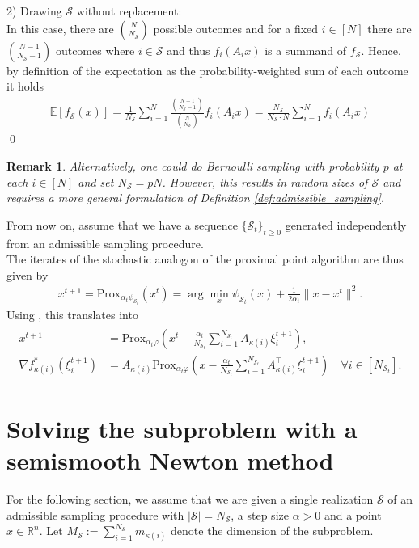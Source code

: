 \documentclass[12pt,a4paper,twoside]{article}
\makeatletter
\renewcommand*{\eqref}[1]{%
	\hyperref[{#1}]{\textup{\tagform@{\ref*{#1}}}}%
}
\theoremstyle{plain}
\newtheorem{rem}[thm]{Remark}
\theoremstyle{note}
\numberwithin{thm}{section}
\newcommand{\prox}[2]{\text{Prox}_{#1}\left(#2\right)}
\newcommand{\oneover}[1]{\frac{1}{#1}}
\newcommand{\ixmap}[1]{{\kappa(#1)}}
\let\temp\phi
\let\phi\varphi
\let\varphi\temp
\makeatother
\begin{document}
	2) Drawing $\mathcal{S}$ without replacement:\\
	In this case, there are ${N \choose N_\mathcal{S}}$ possible outcomes and for a fixed $i\in [N]$ there are ${N-1 \choose N_\mathcal{S}-1}$ outcomes where $i\in \mathcal{S}$ and thus $f_i(A_ix)$ is a summand of $f_\mathcal{S}$. Hence, by definition of the expectation as the probability-weighted sum of each outcome it holds
	\begin{align*}
	\mathbb{E}[f_\mathcal{S}(x)] =   \oneover{N_\mathcal{S}} \sum_{i=1}^{N} \frac{{N-1 \choose N_\mathcal{S}-1}}{{N \choose N_\mathcal{S}}} f_i(A_ix) = \frac{N_\mathcal{S}}{N_\mathcal{S} \cdot N} \sum_{i=1}^{N} f_i(A_ix)  
	\end{align*}
	\qed
	\\
	\begin{rem}
		Alternatively, one could do Bernoulli sampling with probability $p$ at each $i\in [N]$ and set $N_\mathcal{S} = pN$. However, this results in random sizes of $\mathcal{S}$ and requires a more general formulation of Definition \ref{def:admissible_sampling}.
	\end{rem}	
	From now on, assume that we have a sequence $\{\mathcal{S}_t\}_{t\geq 0}$ generated independently from an admissible sampling procedure.\\
	The iterates of the stochastic analogon of the proximal point algorithm are thus given by
	\begin{align*}
		x^{t+1} = \prox{\alpha_t \psi_{\mathcal{S}_t}}{x^t} = \arg \min_x \psi_{\mathcal{S}_t}(x) + \oneover{2\alpha_t}\|x-x^t\|^2.
	\end{align*}
	Using \eqref{eqn:nonlinear_system}, this translates into
	\begin{align}
	\label{eqn:nonlinear_system_stochastic}
	\begin{split}
	x^{t+1} &= \prox{\alpha_t \phi}{x^t - \frac{\alpha_t}{N_{\mathcal{S}_t}} \sum_{i =1}^{N_{\mathcal{S}_t}} A_\ixmap{i}^\intercal \xi_i^{t+1}}, \\
	\nabla f_\ixmap{i}^\ast(\xi_i^{t+1}) &= A_\ixmap{i} \prox{\alpha_t \phi}{x - \frac{\alpha_t}{N_{\mathcal{S}_t}}\sum_{i =1}^{N_{\mathcal{S}_t}} A_\ixmap{i}^\intercal \xi_i^{t+1}} \quad \forall i \in [N_{\mathcal{S}_t}].
	\end{split}
	\end{align}
	
\section{Solving the subproblem with a semismooth Newton method}
	For the following section, we assume that we are given a single realization $\mathcal{S}$ of an admissible sampling procedure with $|\mathcal{S}| = N_\mathcal{S}$, a step size $\alpha >0$ and a point $x\in \mathbb{R}^n$. Let $M_{\mathcal{S}} := \sum_{i =1}^{N_\mathcal{S}}m_{\ixmap{i}}$ denote the dimension of the subproblem.
	
\end{document}
